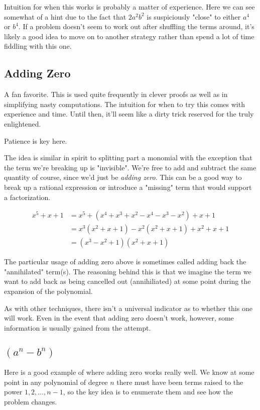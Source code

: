 \documentclass{standalone}
\begin{document}
Intuition for when this works is probably a matter of experience. Here we can
see somewhat of a hint due to the fact that $2a^2b^2$ is suspiciously "close"
to either $a^4$ or $b^4$. If a problem doesn't seem to work out after shuffling
the terms around, it's likely a good idea to move on to another strategy rather
than spend a lot of time fiddling with this one.

\subsection{Adding Zero}

A fan favorite. This is used quite frequently in clever proofs as well as in
simplifying nasty computations. The intuition for when to try this comes with
experience and time. Until then, it'll seem like a dirty trick reserved for the
truly enlightened.

Patience is key here.

The idea is similar in spirit to splitting part a monomial with the exception
that the term we're breaking up is "invisible". We're free to add and subtract
the same quantity of course, since we'd just be \emph{adding zero}. This can be
a good way to break up a rational expression or introduce a "missing" term that
would support a factorization.

\begin{align*}
  x^5 + x + 1
  &= x^5 + (x^4 + x^3 + x^2 - x^4 - x^3 - x^2) + x + 1 \\
  &= x^3(x^2 + x + 1) - x^2(x^2 + x + 1) + x^2 + x + 1 \\
  &= (x^3 - x^2 + 1)(x^2 + x + 1)
\end{align*}

The particular usage of adding zero above is sometimes called adding back the
"annihilated" term(s). The reasoning behind this is that we imagine the term we
want to add back as being cancelled out (annihiliated) at some point during the
expansion of the polynomial.

As with other techniques, there isn't a universal indicator as to whether this
one will work. Even in the event that adding zero doesn't work, however, some
information is usually gained from the attempt.

\subsection{\( (a^n - b^n) \)}

Here is a good example of where adding zero works really well. We know at some
point in any polynomial of degree $n$ there must have been terms raised to the
power $1, 2, \dots, n-1$, so the key idea is to enumerate them and see how the
problem changes.
\end{document}
